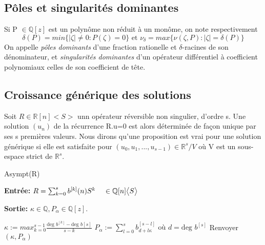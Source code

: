 \documentclass[a4paper,10.5pt]{article}
\begin{document}
	\subsection{Pôles et singularités dominantes}
	
	\begin{definition} Si P $\in \mathbb{Q}[z]$ est un polynôme non réduit à un monôme, on note respectivement
		\[\delta(P)=min\{|\zeta| \neq 0: P(\zeta)=0\} \text{ et } \nu_{\delta}=max\{\nu(\zeta,P):|\zeta|=\delta(P)\}\] 
		On appelle \textit{pôles dominants} d'une fraction rationelle et $\delta$-racines  de son dénominateur, et \textit{singularités dominantes} d'un opérateur différentiel à coefficient polynomiaux celles de son coefficient de tête.  
	\end{definition}
	
	\subsection{Croissance générique des solutions}
	
	\begin{definition} Soit $R \in \mathbb{R}[n]\big< S\big>$ unn opérateur réversible non singulier, d'ordre s. Une solution $(u_{n})$ de la récurrence R.u=0 est alors déterminée de façon unique par ses s premières valeurs. Nous dirons qu'une proposition est vrai pour une solution générique si elle est satisfaite pour $(u_{0},u_{1},...,u_{s-1}) \in \mathbb{R}^{s}/V$ où V est un sous-espace strict de $\mathbb{R}^{s}$.
		
	\end{definition}
	
	\begin{algorithm}
		\caption{Asympt(R)}
		
		\vspace{2mm}
		
		\textbf{Entrée:} $R=\sum_{k=0}^{s} b^{[k]}(n)S^{k} \hspace{4mm} \in \mathbb{Q}[n]\big<S\big>$
		
		\textbf{Sortie:} $\kappa \in \mathbb{Q}, P_{\alpha} \in \mathbb{Q}[z].$
		
		\begin{algorithmic}[1]
			\vspace{4mm}
			\STATE $\kappa:= max_{k=0}^{s-1}\frac{\text{deg } b^{[k]}-\text{deg } b{[s]}}{s-k}$
			\vspace{4mm}
			\STATE $P_{\alpha}:=\sum_{l=0}^{s} b_{d+l\kappa}^{[s-l]}\text{ où } d=\text{deg } b^{[s]}$
			\vspace{4mm}
			\STATE Renvoyer $(\kappa,P_{\alpha})$
		\end{algorithmic}
		
	\end{algorithm}
	
\end{document}
